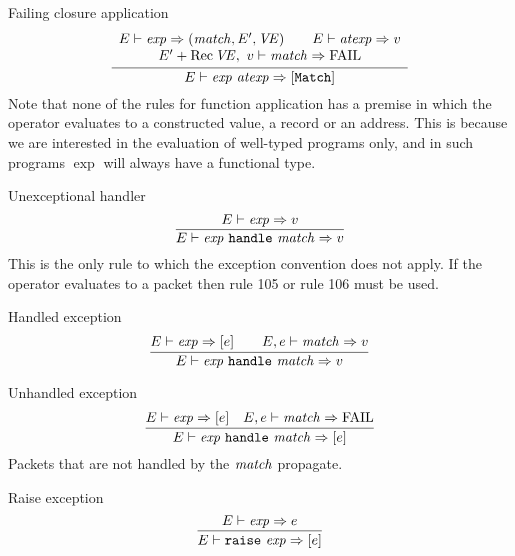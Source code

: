 \begin{inference-rule}{Failing closure application}
\begin{equation}\label{rule:dynamic-core:closapp1}
\vcenter{\infer{\E\ts\appexp\ra[{\tt Match}]}
  {\begin{array}{c}
      \E\ts\exp\ra(\match,\E',\VE)\qquad\E\ts\atexp\ra\V\\
      \E'+\Rec\VE,\ \V\ts\match\ra\FAIL
   \end{array}}}
\end{equation}
Note that none of the rules for function application has a premise
in which the operator evaluates to a constructed value, a record or an
address. This is because we are interested in the evaluation of
well-typed programs only, and in such programs $\exp$ will always have a
functional type.
\end{inference-rule}

\begin{inference-rule}{Unexceptional handler}
\begin{equation}\label{rule:dynamic-core:handlexp}
\vcenter{\infer{\E\ts\handlexp\ra\V}
  {\E\ts\exp\ra\V}}
\end{equation}
This is the only rule to which the exception convention does not apply.
If the operator evaluates to a packet then rule 105 or rule 106 must be
used.
\end{inference-rule}

\begin{inference-rule}{Handled exception}
\begin{equation}\label{rule:dynamic-core:handlexp2}
\vcenter{\infer{\E\ts\handlexp\ra\V}
  {\E\ts\exp\ra[\exval]\qquad\E,\exval\ts\match\ra\V}}
\end{equation}
\end{inference-rule}

\begin{inference-rule}{Unhandled exception}
\begin{equation}\label{rule:dynamic-core:handlexp3}
\vcenter{\infer{\E\ts\handlexp\ra[\exval]}
  {\E\ts\exp\ra[\exval]
    & \E,\exval\ts\match\ra\FAIL}}
\end{equation}
Packets that are not handled by the $\textit{match\/}$ propagate.
\end{inference-rule}

\begin{inference-rule}{Raise exception}
\begin{equation}\label{rule:dynamic-core:raisexp}
\vcenter{\infer{\E\ts\raisexp\ra[\exval]}
  {\E\ts\exp\ra\exval}}
\end{equation}
\end{inference-rule}

